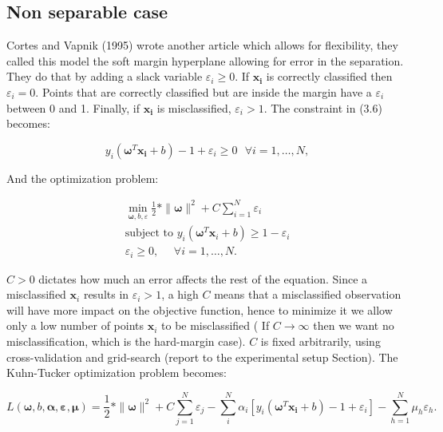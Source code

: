 \documentclass[a4paper,12pt]{article}
\numberwithin{equation}{section}
\begin{document}
\newpage
\subsection{Non separable case}

Cortes and Vapnik (1995) wrote another article which allows for flexibility, they called this model the soft margin hyperplane allowing for error in the separation. They do that by adding a slack variable $\varepsilon_i \geq 0 $. If $\boldsymbol{x_i}$ is correctly classified then $\varepsilon_i = 0 $. Points that are correctly classified but are inside the margin have a $\varepsilon_i$ between 0 and 1. Finally, if $\boldsymbol{x_i}$ is misclassified, $\varepsilon_i > 1 $.  The constraint in (3.6) becomes:

\begin{equation}\label{eq:12}
y_i(\boldsymbol{\omega}^T\boldsymbol{x_i}+b)-1+\varepsilon_i\geq 0 \mbox{   } \forall i = 1,\dots,N ,
\end{equation}

And the optimization problem:


\begin{align*}
  \min_{\boldsymbol{\omega},b,\varepsilon} \frac{1}{2}*\|\boldsymbol{\omega}\|^2 + C\sum_{i=1}^{N}\varepsilon_i \\
  \mbox{subject to } y_i(\boldsymbol{\omega}^T\boldsymbol{x}_i+b) \geq 1 -\varepsilon_i\\
  \varepsilon_i \geq 0, \mbox{ } \mbox{ } \forall i = 1,\dots,N.
\end{align*}


$C > 0$ dictates how much an error affects the rest of the equation. Since a misclassified $\boldsymbol{x}_i$ results in $\varepsilon_i > 1$, a high $C$ means that a misclassified observation will have more impact on the objective function, hence to minimize it we allow only a low number of points $\boldsymbol{x}_i$ to be misclassified ( If $ C \rightarrow \infty$ then we want no misclassification, which is the hard-margin case). $C$ is fixed arbitrarily, using cross-validation and grid-search (report to the experimental setup Section). The Kuhn-Tucker optimization problem becomes:


\begin{equation}\label{eq:13}
  L(\boldsymbol{\omega},b,\boldsymbol{\alpha},\boldsymbol{\varepsilon},\boldsymbol{\mu})= \frac{1}{2}*\|\boldsymbol{\omega}\|^2 + C\sum_{j=1}^{N}\varepsilon_j- \sum_{i}^{N}\alpha_i[y_i(\boldsymbol{\omega}^T\boldsymbol{x_i}+b)-1+\varepsilon_i]-\sum_{h=1}^{N}\mu_h\varepsilon_h.
\end{equation}
\end{document}
